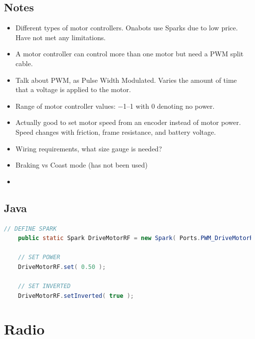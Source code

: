 \documentclass[letterpaper,10pt]{memoir}
\begin{document}
\subsection*{Notes}
\begin{itemize}
\item Different types of motor controllers. Onabots use Sparks due to low price. Have not met any limitations.

\item A motor controller can control more than one motor but need a PWM split cable.

\item Talk about PWM, as Pulse Width Modulated. Varies the amount of time that a voltage is applied to the motor.

\item Range of motor controller values: \SIrange{-1}{1}{} with \num{0} denoting no power.

\item Actually good to set motor speed from an encoder instead of motor power. Speed changes with friction, frame resistance, and battery voltage.

\item Wiring requirements, what size gauge is needed?

\item Braking vs Coast mode (has not been used)

\item 
\end{itemize}

\subsection*{Java}
\lstset{language=Java}
\begin{lstlisting}[language=Java]
	// DEFINE SPARK
	public static Spark DriveMotorRF = new Spark( Ports.PWM_DriveMotorRF );

	// SET POWER
	DriveMotorRF.set( 0.50 );
	
	// SET INVERTED
	DriveMotorRF.setInverted( true );
\end{lstlisting}



\newpage\section*{Radio}
\end{document}
